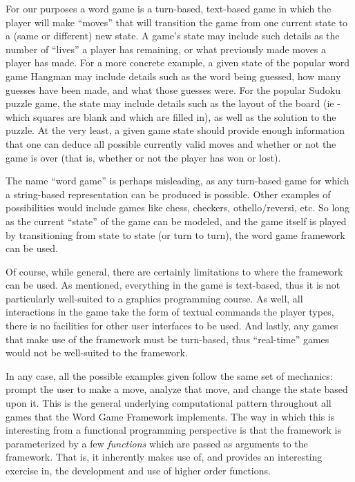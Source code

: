 For our purposes a word game is a turn-based, text-based game in which the player will make ``moves'' that will transition the game from one current state to a (same or different) new state.  A game's state may include such details as the number of ``lives'' a player has remaining, or what previously made moves a player has made.  For a more concrete example, a given state of the popular word game Hangman may include details such as the word being guessed, how many guesses have been made, and what those guesses were.  For the popular Sudoku puzzle game, the state may include details such as the layout of the board (ie - which squares are blank and which are filled in), as well as the solution to the puzzle.  At the very least, a given game state should provide enough information that one can deduce all possible currently valid moves and whether or not the game is over (that is, whether or not the player has won or lost).

The name ``word game'' is perhaps misleading, as any turn-based game for which a string-based representation can be produced is possible.  Other examples of possibilities would include games like chess, checkers, othello/reversi, etc.  So long as the current ``state'' of the game can be modeled, and the game itself is played by transitioning from state to state (or turn to turn), the word game framework can be used.

Of course, while general, there are certainly limitations to where the framework can be used.  As mentioned, everything in the game is text-based, thus it is not particularly well-suited to a graphics programming course.  As well, all interactions in the game take the form of textual commands the player types, there is no facilities for other user interfaces to be used.  And lastly, any games that make use of the framework must be turn-based, thus ``real-time'' games would not be well-suited to the framework.

In any case, all the possible examples given follow the same set of mechanics: prompt the user to make a move, analyze that move, and change the state based upon it.  This is the general underlying computational pattern throughout all games that the Word Game Framework implements.  The way in which this is interesting from a functional programming perspective is that the framework is parameterized by a few \emph{functions} which are passed as arguments to the framework.  That is, it inherently makes use of, and provides an interesting exercise in, the development and use of higher order functions.

